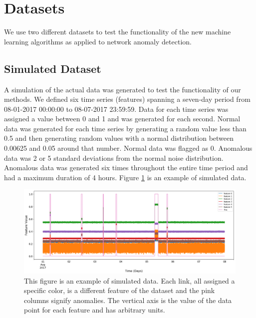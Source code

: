 \documentclass[5p]{elsarticle}
\begin{document}
\section{Datasets}

We use two different datasets to test the functionality of the new machine learning algorithms as applied to network anomaly detection. 

\subsection{Simulated Dataset}

A simulation of the actual data was generated to test the functionality of our methods. We defined six time series (features) spanning a seven-day period from 08-01-2017 00:00:00 to 08-07-2017 23:59:59. Data for each time series was assigned a value between 0 and 1 and was generated for each second. Normal data was generated for each time series by generating a random value less than 0.5 and then generating random values with a normal distribution between 0.00625 and 0.05 around that number. Normal data was flagged as 0. Anomalous data was 2 or 5 standard deviations from the normal noise distribution. Anomalous data was generated six times throughout the entire time period and had a maximum duration of 4 hours. Figure \ref{fig:untouched} is an example of simulated data. 

\begin{figure}[htbp]
    \centering
    \includegraphics[width=1.0\textwidth]{untouched.png}
    \caption{This figure is an example of simulated data. Each link, all assigned a specific color, is a different feature of the dataset and the pink columns signify anomalies. The vertical axis is the value of the data point for each feature and has arbitrary units.}
    \label{fig:untouched}
\end{figure}

\iffalse
\end{document}
